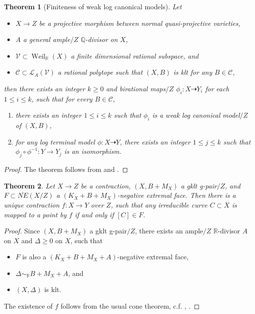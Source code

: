 \documentclass[11pt]{amsart}
\numberwithin{equation}{section}
\newcommand{\Qq}{\mathbb{Q}}
\newcommand{\Rr}{\mathbb{R}}
\newcommand{\Weil}{\operatorname{Weil}}
\newtheorem{thm}{Theorem}[section]
\theoremstyle{definition}
\theoremstyle{remark}
\theoremstyle{definition}
\begin{document}
\begin{thm}[Finiteness of weak log canonical models]\label{thm: finiteness ltm}
Let 
\begin{itemize}
\item $X\rightarrow Z$ be a projective morphism between normal quasi-projective varieties,
\item $A$ a general ample$/Z$ $\Qq$-divisor on $X$,
\item $\mathcal{V}\subset\Weil_{\Rr}(X)$ a finite dimensional rational subspace, and
\item $\mathcal{C}\subset\mathcal{L}_A(\mathcal{V})$ a rational polytope such that $(X,B)$ is klt for any $B\in\mathcal{C}$,
\end{itemize}
then there exists an integer $k\geq 0$ and birational maps$/Z$ $\phi_i: X\dashrightarrow Y_i$ for each $1\leq i\leq k$, such that for every $B\in\mathcal{C}$,
\begin{enumerate}
    \item there exists an integer $1\leq i\leq k$ such that $\phi_i$ is a weak log canonical model$/Z$ of $(X,B)$,
    \item for any log terminal model $\phi: X\dashrightarrow Y$, there exists an integer $1\leq j\leq k$ such that $\phi_j\circ\phi^{-1}: Y\rightarrow Y_j$ is an isomorphism.
\end{enumerate}
\end{thm}

\begin{proof}
The theorem follows from \cite[Theorem C]{BCHM10} and \cite[Theorem E]{BCHM10}.
\end{proof}

\begin{thm}\label{thm: contraction extremal face gklt}
Let $X\rightarrow Z$ be a contraction, $(X,B+M_X)$ a gklt g-pair$/Z$, and $F\subset\overline{NE}(X/Z)$ a $(K_X+B+M_X)$-negative extremal face. Then there is a unique contraction $f: X\rightarrow Y$ over $Z$, such that any irreducible curve $C\subset X$ is mapped to a point by $f$ if and only if $[C]\in F$.
\end{thm}
\begin{proof}
Since $(X,B+M_X)$ a gklt g-pair$/Z$, there exists an ample$/Z$ $\Rr$-divisor $A$ on $X$ and $\Delta\geq 0$ on $X$, such that 
\begin{itemize}
    \item $F$ is also a $(K_X+B+M_X+A)$-negative extremal face,
    \item $\Delta\sim_{\mathbb R}B+M_X+A$, and
    \item $(X,\Delta)$ is klt.
\end{itemize}
The existence of $f$ follows from the usual cone theorem, c.f. \cite[Theorem 3.25]{KM98}, \cite[Theorem 3-2-1]{KMM87}.
\end{proof}
\end{document}
